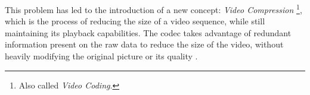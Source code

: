 
This problem has led to the introduction of a new concept: \textit{Video Compression} \footnote{Also called \textit{Video Coding}.}, which is the process of reducing the size of a video sequence, while still maintaining its playback capabilities. The \Gls{codec} takes advantage of redundant information present on the raw data to reduce the size of the video, without heavily modifying the original picture or its quality
.




\printbibliography[heading=subbibliography]
